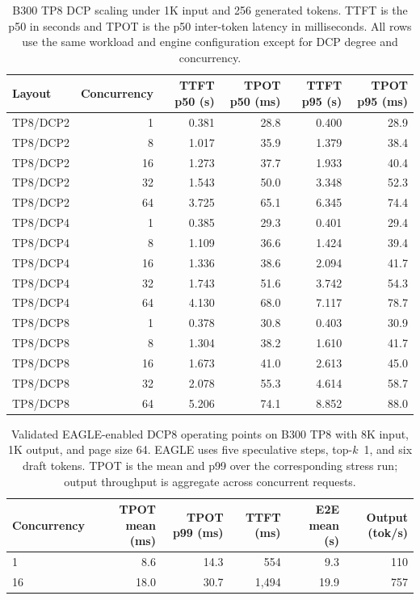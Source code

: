 \begin{table}[H]
\centering
\caption{B300 TP8 DCP scaling under 1K input and 256 generated tokens. TTFT is the p50 in seconds and TPOT is the p50 inter-token latency in milliseconds. All rows use the same workload and engine configuration except for DCP degree and concurrency.}
\label{tab:mol_dcp_scaling}
\scriptsize
\begin{tabular}{lrrrrr}
\toprule
Layout & Concurrency & TTFT p50 (s) & TPOT p50 (ms) & TTFT p95 (s) & TPOT p95 (ms) \\
\midrule
TP8/DCP2 & 1  & 0.381 & 28.8 & 0.400 & 28.9 \\
TP8/DCP2 & 8  & 1.017 & 35.9 & 1.379 & 38.4 \\
TP8/DCP2 & 16 & 1.273 & 37.7 & 1.933 & 40.4 \\
TP8/DCP2 & 32 & 1.543 & 50.0 & 3.348 & 52.3 \\
TP8/DCP2 & 64 & 3.725 & 65.1 & 6.345 & 74.4 \\
\midrule
TP8/DCP4 & 1  & 0.385 & 29.3 & 0.401 & 29.4 \\
TP8/DCP4 & 8  & 1.109 & 36.6 & 1.424 & 39.4 \\
TP8/DCP4 & 16 & 1.336 & 38.6 & 2.094 & 41.7 \\
TP8/DCP4 & 32 & 1.743 & 51.6 & 3.742 & 54.3 \\
TP8/DCP4 & 64 & 4.130 & 68.0 & 7.117 & 78.7 \\
\midrule
TP8/DCP8 & 1  & 0.378 & 30.8 & 0.403 & 30.9 \\
TP8/DCP8 & 8  & 1.304 & 38.2 & 1.610 & 41.7 \\
TP8/DCP8 & 16 & 1.673 & 41.0 & 2.613 & 45.0 \\
TP8/DCP8 & 32 & 2.078 & 55.3 & 4.614 & 58.7 \\
TP8/DCP8 & 64 & 5.206 & 74.1 & 8.852 & 88.0 \\
\bottomrule
\end{tabular}%
\end{table}

\begin{table}[H]
\centering
\caption{Validated EAGLE-enabled DCP8 operating points on B300 TP8 with 8K input, 1K output, and page size 64. EAGLE uses five speculative steps, top-$k$~1, and six draft tokens. TPOT is the mean and p99 over the corresponding stress run; output throughput is aggregate across concurrent requests.}
\label{tab:mol_eagle_dcp8}
\scriptsize
\begin{tabular}{lrrrrr}
\toprule
Concurrency & TPOT mean (ms) & TPOT p99 (ms) & TTFT (ms) & E2E mean (s) & Output (tok/s) \\
\midrule
1  & 8.6  & 14.3 & 554     & 9.3  & 110 \\
16 & 18.0 & 30.7 & 1{,}494 & 19.9 & 757 \\
\bottomrule
\end{tabular}
\end{table}

